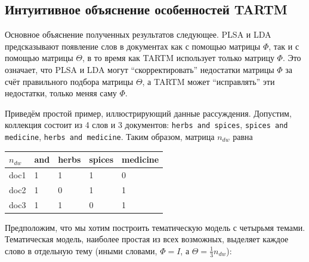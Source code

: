  

\subsection{Интуитивное объяснение особенностей TARTM} 

 

Основное объяснение полученных результатов следующее. PLSA и LDA предсказывают появление слов в документах как с помощью матрицы $\Phi$, так и с помощью матрицы $\Theta$, в то время как TARTM использует только матрицу $\Phi$. Это означает, что PLSA и LDA могут ``скорректировать'' недостатки матрицы $\Phi$ за счёт правильного подбора матрицы $\Theta$, а TARTM может ``исправлять'' эти недостатки, только меняя саму $\Phi$. 

 

Приведём простой пример, иллюстрирующий данные рассуждения. Допустим, коллекция состоит из 4 слов и 3 документов: \texttt{herbs and spices}, \texttt{spices and medicine}, \texttt{herbs and medicine}. Таким образом, матрица $n_{dw}$ равна 

 

\begin{center} 

\begin{tabular}{l|llll} 

$n_{dw}$   & and & herbs & spices & medicine \\ \hline 

doc1       & 1   & 1     & 1      & 0        \\ 

doc2       & 1   & 0     & 1      & 1        \\ 

doc3       & 1   & 1     & 0      & 1        

\end{tabular} 

\end{center} 

 

Предположим, что мы хотим построить тематическую модель с четырьмя темами. Тематическая модель, наиболее простая из всех возможных, выделяет каждое слово в отдельную тему (иными словами, $\Phi = I$, а $\Theta = \frac{1}{3} n_{dw}$): 

